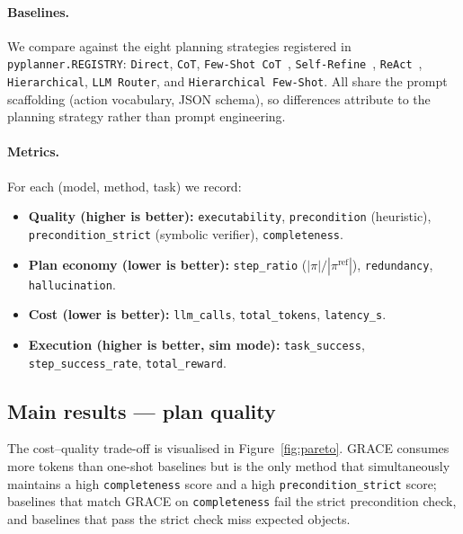 \paragraph{Baselines.}
We compare against the eight planning strategies registered in
\texttt{pyplanner.REGISTRY}: \texttt{Direct}, \texttt{CoT},
\texttt{Few-Shot CoT}~\cite{wei2022cot},
\texttt{Self-Refine}~\cite{madaan2023selfrefine},
\texttt{ReAct}~\cite{yao2022react}, \texttt{Hierarchical},
\texttt{LLM Router}, and \texttt{Hierarchical Few-Shot}. All share
the prompt scaffolding (action vocabulary, JSON schema), so
differences attribute to the planning strategy rather than prompt
engineering.

\paragraph{Metrics.}
For each (model, method, task) we record:
\begin{itemize}
  \item \textbf{Quality (higher is better):} \texttt{executability},
    \texttt{precondition} (heuristic), \texttt{precondition\_strict}
    (symbolic verifier), \texttt{completeness}.
  \item \textbf{Plan economy (lower is better):} \texttt{step\_ratio}
    ($|\pi| / |\pi^{\mathrm{ref}}|$), \texttt{redundancy},
    \texttt{hallucination}.
  \item \textbf{Cost (lower is better):} \texttt{llm\_calls},
    \texttt{total\_tokens}, \texttt{latency\_s}.
  \item \textbf{Execution (higher is better, sim mode):}
    \texttt{task\_success}, \texttt{step\_success\_rate},
    \texttt{total\_reward}.
\end{itemize}

\subsection{Main results --- plan quality}\label{sec:main}


The cost--quality trade-off is visualised in
Figure~\ref{fig:pareto}. GRACE consumes more tokens than one-shot
baselines but is the only method that simultaneously maintains a high
\texttt{completeness} score and a high
\texttt{precondition\_strict} score; baselines that match GRACE on
\texttt{completeness} fail the strict precondition check, and
baselines that pass the strict check miss expected objects.


